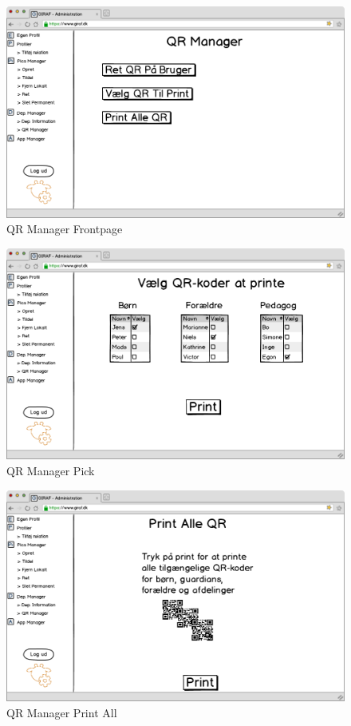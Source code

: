 \begin{figure}[p]
\centering
\includegraphics[width=14cm]{images/mockup/qrManagerFront.png}
\caption{QR Manager Frontpage}
\label{fig:qr_manager_front}
\end{figure}

\newpage

\begin{figure}[p]
\centering
\includegraphics[width=14cm]{images/mockup/qrManagerPick.png}
\caption{QR Manager Pick}
\label{fig:qr_manager_pick}
\end{figure}

\begin{figure}[p]
\centering
\includegraphics[width=14cm]{images/mockup/qrManagerPrintAll.png}
\caption{QR Manager Print All}
\label{fig:qr_manager_print_all}
\end{figure}